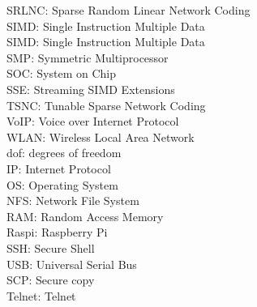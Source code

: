\documentclass[electronics,article,submit,moreauthors,pdftex,10pt,a4paper]{mdpi}
\theoremstyle{mdpi}
\newcounter{ex}
\newcounter{re}
\theoremstyle{mdpidefinition}
\begin{document}
{{SRLNC: Sparse Random Linear Network Coding\\
SIMD: Single Instruction Multiple Data\\
SIMD: Single Instruction Multiple Data\\
SMP: Symmetric Multiprocessor\\
SOC: System on Chip\\
SSE: Streaming SIMD Extensions\\
TSNC: Tunable Sparse Network Coding\\
VoIP: Voice over Internet Protocol\\
WLAN: Wireless Local Area Network\\
dof: degrees of freedom\\
IP: Internet Protocol\\
OS: Operating System\\
NFS: Network File System\\
RAM: Random Access Memory\\
Raspi: Raspberry Pi\\
SSH: Secure Shell\\
USB: Universal Serial Bus\\
SCP: Secure copy\\
Telnet: Telnet}}




\end{document}
